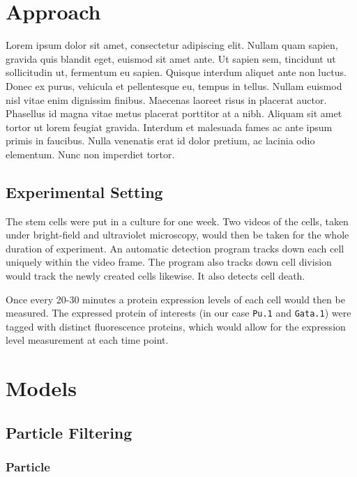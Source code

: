 \documentclass{bioinfo}
\begin{document}
\section{Approach}

Lorem ipsum dolor sit amet, consectetur adipiscing elit. Nullam quam sapien, gravida quis blandit eget, euismod sit amet ante. Ut sapien sem, tincidunt ut sollicitudin ut, fermentum eu sapien. Quisque interdum aliquet ante non luctus. Donec ex purus, vehicula et pellentesque eu, tempus in tellus. Nullam euismod nisl vitae enim dignissim finibus. Maecenas laoreet risus in placerat auctor. Phasellus id magna vitae metus placerat porttitor at a nibh. Aliquam sit amet tortor ut lorem feugiat gravida. Interdum et malesuada fames ac ante ipsum primis in faucibus. Nulla venenatis erat id dolor pretium, ac lacinia odio elementum. Nunc non imperdiet tortor.

\subsection{Experimental Setting}

The stem cells were put in a culture for one week. Two videos of the cells, taken under bright-field and ultraviolet microscopy, would then be taken for the whole duration of experiment. An automatic detection program tracks down each cell uniquely within the video frame. The program also tracks down cell division would track the newly created cells likewise. It also detects cell death.

Once every 20-30 minutes a  protein expression levels of each cell would then be measured. The expressed protein of interests (in our case \texttt{Pu.1} and \texttt{Gata.1}) were tagged with distinct fluorescence proteins, which would allow for the expression level measurement at each time point.

\section{Models}

\subsection{Particle Filtering}

\subsubsection{Particle}
\end{document}
